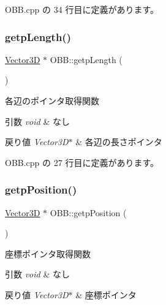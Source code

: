  O\+B\+B.\+cpp の 34 行目に定義があります。

\mbox{\label{class_o_b_b_a831280fe9affdea9bd5c4c6f28d4a9cc}} 
\subsubsection{\texorpdfstring{getp\+Length()}{getpLength()}}
{\footnotesize\ttfamily \mbox{\hyperlink{class_vector3_d}{Vector3D}} $\ast$ O\+B\+B\+::getp\+Length (\begin{DoxyParamCaption}{ }\end{DoxyParamCaption})}



各辺のポインタ取得関数 


\begin{DoxyParams}{引数}
{\em void} & なし \\
\hline
\end{DoxyParams}

\begin{DoxyRetVals}{戻り値}
{\em Vector3\+D$\ast$} & 各辺の長さポインタ \\
\hline
\end{DoxyRetVals}


 O\+B\+B.\+cpp の 27 行目に定義があります。

\mbox{\label{class_o_b_b_ae2e378f96e4b3899e133ce50b91155a8}} 
\subsubsection{\texorpdfstring{getp\+Position()}{getpPosition()}}
{\footnotesize\ttfamily \mbox{\hyperlink{class_vector3_d}{Vector3D}} $\ast$ O\+B\+B\+::getp\+Position (\begin{DoxyParamCaption}{ }\end{DoxyParamCaption})}



座標ポインタ取得関数 


\begin{DoxyParams}{引数}
{\em void} & なし \\
\hline
\end{DoxyParams}

\begin{DoxyRetVals}{戻り値}
{\em Vector3\+D$\ast$} & 座標ポインタ \\
\hline
\end{DoxyRetVals}


